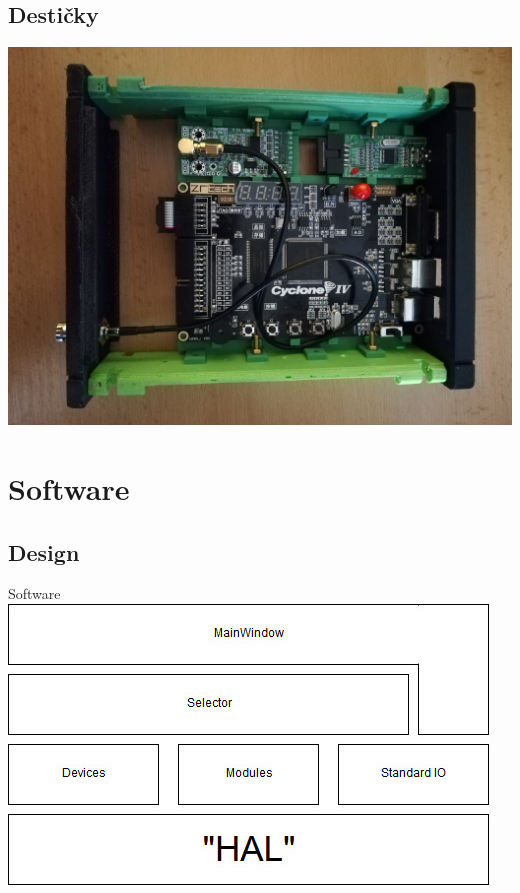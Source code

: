 \documentclass{beamer}
\begin{document}
	\subsection{Destičky}
	\begin{frame}{}
		\centering
		\includegraphics[height=0.90\paperheight]{intensities.jpg}
	\end{frame}
	
\section{Software}

	\subsection{Design}
		\begin{frame}{Software}
			\centering
			\includegraphics[width=\linewidth]{software_layers.jpg}
	\end{frame}
\end{document}
